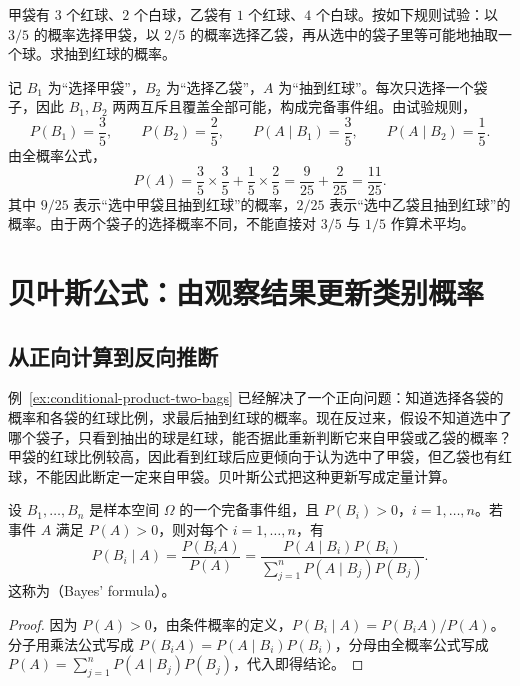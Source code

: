 \documentclass[UTF8]{ctexart}
\begin{document}
\begin{example}[从各袋红球比例求总体红球概率]
\label{ex:conditional-product-two-bags}
甲袋有 $3$ 个红球、$2$ 个白球，乙袋有 $1$ 个红球、$4$ 个白球。按如下规则试验：以 $3/5$ 的概率选择甲袋，以 $2/5$ 的概率选择乙袋，再从选中的袋子里等可能地抽取一个球。求抽到红球的概率。
\end{example}
\begin{solve}
记 $B_1$ 为“选择甲袋”，$B_2$ 为“选择乙袋”，$A$ 为“抽到红球”。每次只选择一个袋子，因此 $B_1,B_2$ 两两互斥且覆盖全部可能，构成完备事件组。由试验规则，
\[
  P(B_1)=\frac35,\qquad P(B_2)=\frac25,
  \qquad
  P(A\mid B_1)=\frac35,\qquad P(A\mid B_2)=\frac15.
\]
由全概率公式，
\begin{equation}
  P(A)=\frac35\times\frac35+\frac15\times\frac25
      =\frac9{25}+\frac2{25}
      =\frac{11}{25}.
  \label{eq:conditional-product-two-bags-total}
\end{equation}
其中 $9/25$ 表示“选中甲袋且抽到红球”的概率，$2/25$ 表示“选中乙袋且抽到红球”的概率。由于两个袋子的选择概率不同，不能直接对 $3/5$ 与 $1/5$ 作算术平均。
\end{solve}

\section{贝叶斯公式：由观察结果更新类别概率}
\label{sec:conditional-product-bayes}

\subsection{从正向计算到反向推断}

例~\ref{ex:conditional-product-two-bags} 已经解决了一个正向问题：知道选择各袋的概率和各袋的红球比例，求最后抽到红球的概率。现在反过来，假设不知道选中了哪个袋子，只看到抽出的球是红球，能否据此重新判断它来自甲袋或乙袋的概率？甲袋的红球比例较高，因此看到红球后应更倾向于认为选中了甲袋，但乙袋也有红球，不能因此断定一定来自甲袋。贝叶斯公式把这种更新写成定量计算。

\begin{theorem}[贝叶斯公式]
\label{thm:conditional-product-bayes}
设 $B_1,\ldots,B_n$ 是样本空间 $\Omega$ 的一个完备事件组，且 $P(B_i)>0$，$i=1,\ldots,n$。若事件 $A$ 满足 $P(A)>0$，则对每个 $i=1,\ldots,n$，有
\begin{equation}
  P(B_i\mid A)
  =\frac{P(B_iA)}{P(A)}
  =\frac{P(A\mid B_i)P(B_i)}
         {\displaystyle\sum_{j=1}^{n}P(A\mid B_j)P(B_j)}.
  \label{eq:conditional-product-bayes}
\end{equation}
这称为（Bayes' formula）。
\end{theorem}
\begin{proof}
因为 $P(A)>0$，由条件概率的定义，$P(B_i\mid A)=P(B_iA)/P(A)$。分子用乘法公式写成 $P(B_iA)=P(A\mid B_i)P(B_i)$，分母由全概率公式写成 $P(A)=\sum_{j=1}^{n}P(A\mid B_j)P(B_j)$，代入即得结论。
\end{proof}
\end{document}
